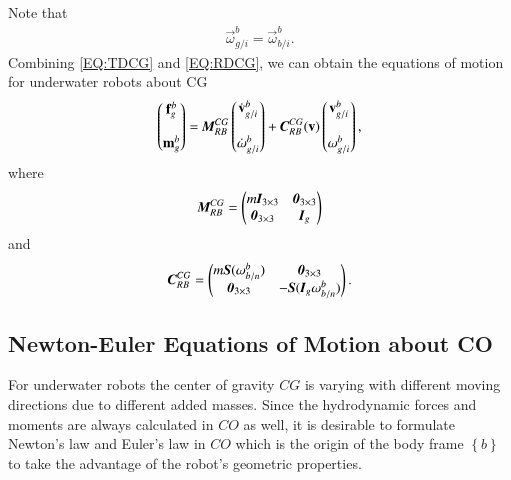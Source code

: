 Note that
\begin{align}
\vec{\omega}^{b}_{g/i}=\vec{\omega}^{b}_{b/i}.
\end{align}
Combining \ref{EQ:TDCG} and \ref{EQ:RDCG}, we can obtain the equations of motion for underwater robots about CG
\begin{align}
\begin{pmatrix} \bigskip
\vec{f}_{g}^{b}\\
\vec{m}_{g}^{b}
\end{pmatrix}=
\bigskip\emph{\textbf{M}}_{RB}^{CG}
\begin{pmatrix}\bigskip
\dot{\vec{v}}^{b}_{g/i}\\ \dot{\vec{\omega}}^{b}_{g/i}
\end{pmatrix}
+
 \bigskip\emph{\textbf{C}}_{RB}^{CG}(\vec{v})\begin{pmatrix}\bigskip
\vec{v}^{b}_{g/i}\\ \vec{\omega}^{b}_{g/i}
\end{pmatrix}\label{EQ:Kinematic},
\end{align}
where
\begin{align}
\emph{\textbf{M}}_{RB}^{CG}=
\begin{pmatrix}
m\emph{\textbf{I}}_{3\times 3}&\emph{\textbf{0}}_{3\times 3} \\
\emph{\textbf{0}}_{3\times 3}&\emph{\textbf{I}}_{g}
\end{pmatrix}
\end{align}
and
\begin{align}
\emph{\textbf{C}}_{RB}^{CG}=
\begin{pmatrix}
m\emph{\textbf{S}}(\vec{\omega}^{b}_{b/n})&\emph{\textbf{0}}_{3\times 3} \\
\emph{\textbf{0}}_{3\times 3}&-\emph{\textbf{S}}(\emph{\textbf{I}}_{g}\vec{\omega}^{b}_{b/n})
\end{pmatrix}.
\end{align}

\subsection{Newton-Euler Equations of Motion about CO}
For underwater robots the center of gravity $CG$ is varying with different moving directions due to different added masses. Since the hydrodynamic forces and moments are always calculated in $CO$ as well, it is desirable to formulate Newton's law and Euler's law in $CO$ which is the origin of the body frame $\left\{ b \right\}$ to take the advantage of the robot's geometric properties.  

